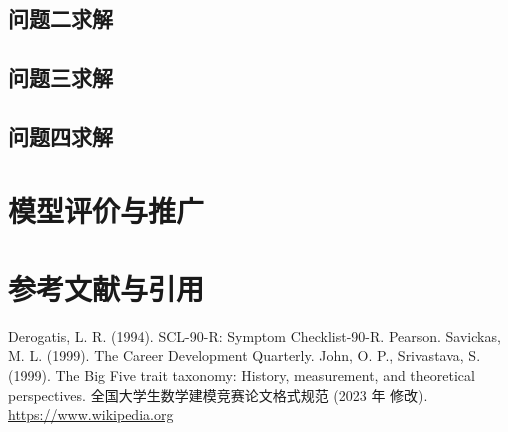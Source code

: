 \documentclass[withoutpreface,bwprint]{cumcmthesis} %
\begin{document}
\subsection{问题二求解}

\subsection{问题三求解}

\subsection{问题四求解}


\section{模型评价与推广}
\section{参考文献与引用}

\begin{thebibliography}{9}%
     Derogatis, L. R. (1994). SCL-90-R: Symptom Checklist-90-R. Pearson.
     Savickas, M. L. (1999). The Career Development Quarterly.
     John, O. P., Srivastava, S. (1999). The Big Five trait taxonomy: History, measurement, and theoretical perspectives.
        全国大学生数学建模竞赛论文格式规范 (2023 年 修改).
     \url{https://www.wikipedia.org}
\end{thebibliography}
\end{document}
